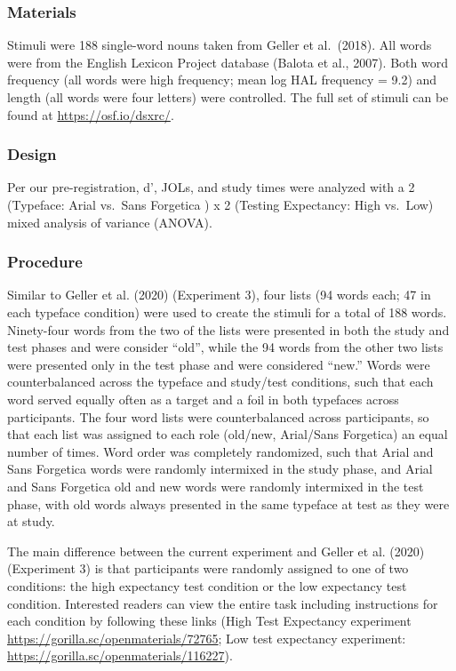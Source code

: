 \documentclass[
  english,
  jou]{apa6}
\begin{document}
\hypertarget{materials}{%
\subsubsection{Materials}\label{materials}}

Stimuli were 188 single-word nouns taken from Geller et al.~(2018). All words were from the English Lexicon Project database (Balota et al., 2007). Both word frequency (all words were high frequency; mean log HAL frequency = 9.2) and length (all words were four letters) were controlled. The full set of stimuli can be found at \url{https://osf.io/dsxrc/}.

\hypertarget{design}{%
\subsubsection{Design}\label{design}}

Per our pre-registration, d', JOLs, and study times were analyzed with a 2 (Typeface: Arial vs.~Sans Forgetica ) x 2 (Testing Expectancy: High vs.~Low) mixed analysis of variance (ANOVA).

\hypertarget{procedure}{%
\subsubsection{Procedure}\label{procedure}}

Similar to Geller et al. (2020) (Experiment 3), four lists (94 words each; 47 in each typeface condition) were used to create the stimuli for a total of 188 words. Ninety-four words from the two of the lists were presented in both the study and test phases and were consider \enquote{old}, while the 94 words from the other two lists were presented only in the test phase and were considered \enquote{new.} Words were counterbalanced across the typeface and study/test conditions, such that each word served equally often as a target and a foil in both typefaces across participants. The four word lists were counterbalanced across participants, so that
each list was assigned to each role (old/new, Arial/Sans Forgetica) an equal number of times. Word order was completely randomized, such that Arial and Sans Forgetica words were randomly intermixed in the study phase, and Arial and Sans Forgetica old and new words were randomly intermixed in the test phase, with old words always presented in the same typeface at test as they were at study.

The main difference between the current experiment and Geller et al. (2020) (Experiment 3) is that participants were randomly assigned to one of two conditions: the high expectancy test condition or the low expectancy test condition. Interested readers can view the entire task including instructions for each condition by following these links (High Test Expectancy experiment \url{https://gorilla.sc/openmaterials/72765}; Low test expectancy experiment: \url{https://gorilla.sc/openmaterials/116227}).
\end{document}
